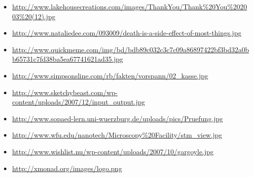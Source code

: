 \documentclass[12pt,compress,ngerman]{beamer}
\begin{document}
{\begin{itemize}
    \item \url{http://www.lakehousecreations.com/images/ThankYou/Thank\%20You\%202003\%20(12).jpg}
    \item \url{http://www.nataliedee.com/093009/death-is-a-side-effect-of-most-things.jpg}
    \item \url{http://www.quickmeme.com/img/bd/bdb89c032c3c7c09a86897422bf3bd32a0bb65731c7fd38ba5ea67741621ad35.jpg}
    \item \url{http://www.simpsonsline.com/rb/fakten/vorspann/02_kasse.jpg}
    \item \url{http://www.sketchybeast.com/wp-content/uploads/2007/12/input_output.jpg}
    \item \url{http://www.sopaed-lern.uni-wuerzburg.de/uploads/pics/Pruefung.jpg}
    \item \url{http://www.wfu.edu/nanotech/Microscopy\%20Facility/stm_view.jpg}
    \item \url{http://www.wishlist.nu/wp-content/uploads/2007/10/gargoyle.jpg}
    \item \url{http://xmonad.org/images/logo.png}
  \end{itemize}
}
\end{document}
